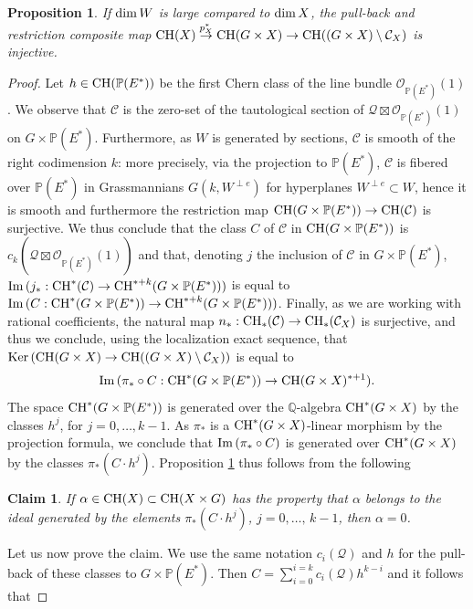 \documentclass[10pt]{article}
\newtheorem{prop}[theo]{Proposition}
\newtheorem{claim}[theo]{Claim}
\begin{document}
 \begin{prop}\label{lefirstred} If ${\rm dim}\,W$ is large compared to ${\rm dim}\,X$,
 the pull-back and restriction composite map
 ${\rm CH}(X)\stackrel{p_X^*}{\rightarrow }{\rm CH}(G\times X)\rightarrow {\rm CH}((G\times X)\setminus \mathcal{C}_X)$ is injective.
\end{prop}
\begin{proof} Let  $h\in{\rm CH}(\mathbb{P}(E^*))$ be the first Chern class of the line bundle $\mathcal{O}_{\mathbb{P}(E^*)}(1)$.
We observe that
$\mathcal{C}$ is the zero-set of the tautological section of $\mathcal{Q}\boxtimes \mathcal{O}_{\mathbb{P}(E^*)}(1)$ on $G\times \mathbb{P}(E^*)$. Furthermore, as
$W$ is generated by sections, $\mathcal{C}$ is smooth of the right codimension $k$: more precisely,
via the projection to $\mathbb{P}(E^*)$, $\mathcal{C}$ is fibered over $\mathbb{P}(E^*)$ in Grassmannians $G(k,W^{\perp e})$ for hyperplanes $W^{\perp e}\subset W$, hence it is smooth and furthermore the restriction map
${\rm CH}(G\times\mathbb{P}(E^*))\rightarrow {\rm CH}(\mathcal{C})$ is surjective.
We thus conclude that the class $C$ of $\mathcal{C}$ in ${\rm CH}(G\times \mathbb{P}(E^*))$ is
$c_k(\mathcal{Q}\boxtimes \mathcal{O}_{\mathbb{P}(E^*)}(1))$ and that, denoting $j$ the inclusion of
$\mathcal{C}$ in $ G\times \mathbb{P}(E^*)$, ${\rm Im}\,(j_*:{\rm CH}^*(\mathcal{C})\rightarrow
{\rm CH}^{*+k}(G\times \mathbb{P}(E^*)))$ is equal to
${\rm Im}\,(C:{\rm CH}^*(G\times \mathbb{P}(E^*)) \rightarrow
{\rm CH}^{*+k}(G\times \mathbb{P}(E^*)))$.
Finally, as we are working with rational coefficients, the natural map
$n_*:{\rm CH}_*(\mathcal{C})\rightarrow {\rm CH}_*(\mathcal{C}_X)$ is surjective, and thus we conclude, using the localization exact sequence, that
${\rm Ker}\,( {\rm CH}(G\times X)\rightarrow  {\rm CH}((G\times X)\setminus \mathcal{C}_X))$ is equal to
\begin{eqnarray}\label{eqmap} {\rm Im}\,(\pi_*\circ C:{\rm CH}^*(G\times \mathbb{P}(E^*)) \rightarrow
{\rm CH}(G\times X)^{*+1}).
\end{eqnarray}
The space ${\rm CH}^*(G\times \mathbb{P}(E^*))$ is generated over the $\mathbb{Q}$-algebra ${\rm CH}^*(G\times X)$ by the classes $h^j$, for $j=0,\ldots, k-1$. As $\pi_*$ is a
${\rm CH}^*(G\times X)$-linear morphism by the projection formula, we conclude that
$ {\rm Im}\,(\pi_*\circ C)$ is generated over ${\rm CH}^*(G\times X)$ by the classes
$\pi_*(C\cdot h^j)$.  Proposition \ref{lefirstred} thus  follows from the following
\begin{claim}\label{claim} If $\alpha\in{\rm CH}(X)\subset  {\rm CH}(X\times G)$ has the property that $\alpha$
belongs to the ideal generated by the elements  $\pi_*(C\cdot h^j)$, $j=0,\ldots,\,k-1$, then
$\alpha=0$.
\end{claim}
Let us now prove the claim.  We use the same notation  $c_i(\mathcal{Q})$ and $h$ for the pull-back of these classes to
$G\times \mathbb{P}(E^*)$. Then $C=\sum_{i=0}^{i=k} c_i(\mathcal{Q})h^{k-i}$
and it follows that


\end{proof}
\end{document}
